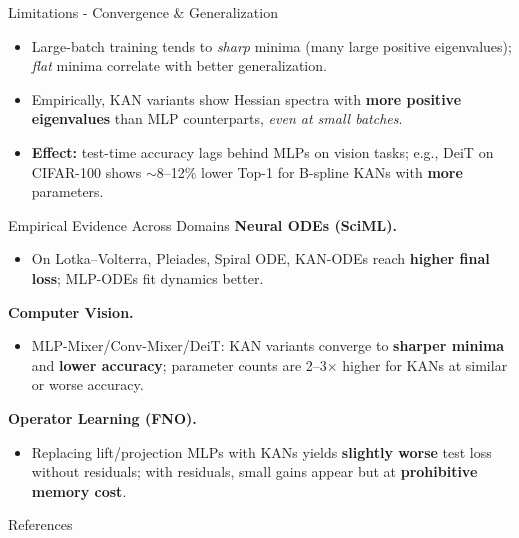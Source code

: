 \documentclass[aspectratio=169]{beamer}
\begin{document}

\begin{frame}{Limitations - Convergence \& Generalization}
	\begin{itemize}
		\item Large-batch training tends to \emph{sharp} minima (many large positive eigenvalues); \emph{flat} minima correlate with better generalization.
		\item Empirically, KAN variants show Hessian spectra with \textbf{more positive eigenvalues} than MLP counterparts, \emph{even at small batches}.
		\item \textbf{Effect:} test-time accuracy lags behind MLPs on vision tasks; e.g., DeiT on CIFAR-100 shows $\sim$8--12\% lower Top-1 for B-spline KANs with \textbf{more} parameters.
	\end{itemize}
\end{frame}


\begin{frame}{Empirical Evidence Across Domains}
	\textbf{Neural ODEs (SciML).}
	\begin{itemize}
		\item On Lotka–Volterra, Pleiades, Spiral ODE, KAN-ODEs reach \textbf{higher final loss}; MLP-ODEs fit dynamics better.
	\end{itemize}
	
	\textbf{Computer Vision.}
	\begin{itemize}
		\item MLP-Mixer/Conv-Mixer/DeiT: KAN variants converge to \textbf{sharper minima} and \textbf{lower accuracy}; parameter counts are 2--3$\times$ higher for KANs at similar or worse accuracy.
	\end{itemize}
	
	\textbf{Operator Learning (FNO).}
	\begin{itemize}
		\item Replacing lift/projection MLPs with KANs yields \textbf{slightly worse} test loss without residuals; with residuals, small gains appear but at \textbf{prohibitive memory cost}.
	\end{itemize}
\end{frame}


\begin{frame}{References}
	\nocite{liu_kan_2025}
	\nocite{pal_understanding_nodate}
	\printbibliography[heading=none]
\end{frame}
\end{document}
